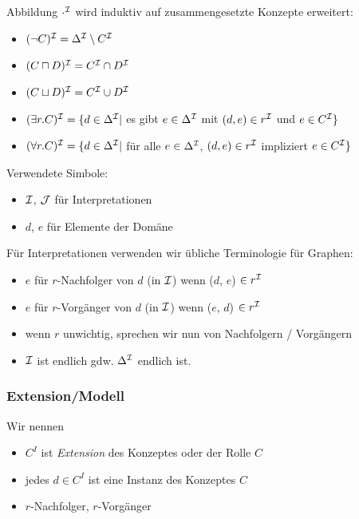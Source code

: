 \noindent Abbildung $\cdot^{\mathcal{I}}$ wird induktiv auf zusammengesetzte Konzepte erweitert:

\begin{itemize}
  \item $(\neg C)^{\mathcal{I}} = \Delta^{\mathcal{I}} \setminus C^{\mathcal{I}}$
  \item $(C \sqcap D)^{\mathcal{I}} = C^{\mathcal{I}} \cap D^{\mathcal{I}}$
  \item $(C \sqcup D)^{\mathcal{I}} = C^{\mathcal{I}} \cup D^{\mathcal{I}}$
  \item $(\exists r.C)^{\mathcal{I}} = \{d \in \Delta^{\mathcal{I}} |$ es gibt $ e \in \Delta^{\mathcal{I}}$ mit $(d,e) \in r^{\mathcal{I}}$ und $e \in C^{\mathcal{I}}\}$
  \item $(\forall r.C)^{\mathcal{I}} = \{d \in \Delta^{\mathcal{I}} |$ für alle $ e \in \Delta^{\mathcal{I}}$, $(d,e) \in r^{\mathcal{I}}$ impliziert $e \in C^{\mathcal{I}}\}$
\end{itemize}

Verwendete Simbole:

\begin{itemize}
  \item $\mathcal{I}$, $\mathcal{J}$ für Interpretationen
  \item $d$, $e$ für Elemente der Domäne
\end{itemize}

Für Interpretationen verwenden wir übliche Terminologie für Graphen:

\begin{itemize}
  \item $e$ für $r$-Nachfolger von $d$ (in $\mathcal{I}$) wenn ($d$, $e$) $\in r^{\mathcal{I}}$
  \item $e$ für $r$-Vorgänger von $d$ (in $\mathcal{I}$) wenn ($e$, $d$) $\in r^{\mathcal{I}}$
  \item wenn $r$ unwichtig, sprechen wir nun von Nachfolgern / Vorgängern
  \item $\mathcal{I}$ ist endlich gdw. $\Delta^{\mathcal{I}}$ endlich ist.
\end{itemize}

\subsubsection{Extension/Modell}\label{exetension}

Wir nennen

\begin{itemize}
\item
  $C^{I}$ ist \emph{Extension} des Konzeptes oder der Rolle $C$
\item
  jedes $d \in C^{I}$ ist eine Instanz des Konzeptes $C$
\item
  $r$-Nachfolger, $r$-Vorgänger
\end{itemize}

